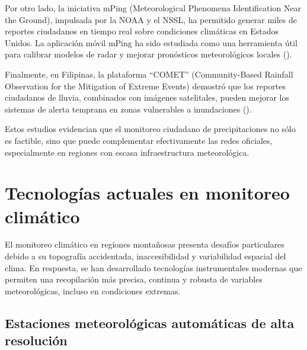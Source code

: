 Por otro lado, la iniciativa mPing (Meteorological Phenomena Identification Near the Ground), impulsada por la NOAA y el NSSL, ha permitido generar miles de reportes ciudadanos en tiempo real sobre condiciones climáticas en Estados Unidos. La aplicación móvil mPing ha sido estudiada como una herramienta útil para calibrar modelos de radar y mejorar pronósticos meteorológicos locales  (\cite{elmore2014mping}).

Finalmente, en Filipinas, la plataforma ``COMET'' (Community-Based Rainfall Observation for the Mitigation of Extreme Events) demostró que los reportes ciudadanos de lluvia, combinados con imágenes satelitales, pueden mejorar los sistemas de alerta temprana en zonas vulnerables a inundaciones  (\cite{okada2019community}).

Estos estudios evidencian que el monitoreo ciudadano de precipitaciones no sólo es factible, sino que puede complementar efectivamente las redes oficiales, especialmente en regiones con escasa infraestructura meteorológica.


































\section{Tecnologías actuales en monitoreo climático}
El monitoreo climático en regiones montañosas presenta desafíos particulares debido a su topografía accidentada, inaccesibilidad y variabilidad espacial del clima. En respuesta, se han desarrollado tecnologías instrumentales modernas que permiten una recopilación más precisa, continua y robusta de variables meteorológicas, incluso en condiciones extremas.

\subsection{Estaciones meteorológicas automáticas de alta resolución}

